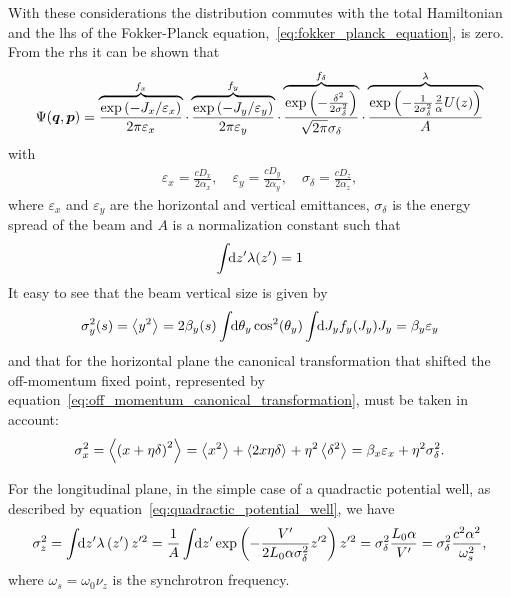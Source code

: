     With these considerations the distribution commutes with the total Hamiltonian and the \gls{lhs} of the Fokker-Planck equation,~\eqref{eq:fokker_planck_equation}, is zero. From the \gls{rhs} it can be shown that
    \begin{align}\label{eq:equilibrium_distribution}
        \Psi(\boldsymbol{q},\boldsymbol{p}) =
        \overbrace{
        \frac{\exp\left(-J_x/\varepsilon_x\right)}{2\pi\varepsilon_x}}^{f_x}\cdot
        \overbrace{
        \frac{\exp\left(-J_y/\varepsilon_y\right)}{2\pi\varepsilon_y}}^{f_y}\cdot
        \overbrace{
        \frac{\exp\left(-\frac{\delta^2}{2\sigma_\delta^2}\right)}{\sqrt{2\pi}\sigma_\delta}}^{f_\delta}\cdot
        \overbrace{
        \frac{\exp\left(-\frac{1}{2\sigma_\delta^2}\frac2\alpha U(z)\right)}{A}}^{\lambda}
    \end{align}
    with
    \begin{align}
        \varepsilon_x = \frac{cD_x}{2\alpha_x}, \quad
        \varepsilon_y = \frac{cD_y}{2\alpha_y}, \quad
        \sigma_\delta = \frac{cD_z}{2\alpha_z},
    \end{align}
    where $\varepsilon_x$ and $\varepsilon_y$ are the horizontal and vertical emittances, $\sigma_\delta$ is the energy spread of the beam and $A$ is a normalization constant such that
    \begin{align}
        \int\!\!\text{d}z' \lambda(z')=1
    \end{align}
    It easy to see that the beam vertical size is given by
    \begin{align}
        \sigma_y^2(s) = \left\langle y^2 \right\rangle_{{}} = 2\beta_y(s)\int\!\!\text{d}\theta_y \cos^2(\theta_y)\int\!\!\text{d}J_y f_y(J_y)J_y = \beta_y\varepsilon_y
    \end{align}
    and that for the horizontal plane the canonical transformation that shifted the off-momentum fixed point, represented by equation~\eqref{eq:off_momentum_canonical_transformation}, must be taken in account:
    \begin{align}
        \sigma_x^2 = \left\langle \left(x+\eta\delta\right)^2 \right\rangle_{{}} = \left\langle x^2 \right\rangle_{{}} + \left\langle 2x\eta\delta \right\rangle_{{}} + \eta^2\left\langle \delta^2 \right\rangle_{{}} = \beta_x\varepsilon_x + \eta^2\sigma_\delta^2.
    \end{align}

    For the longitudinal plane, in the simple case of a quadractic potential well, as described by equation~\eqref{eq:quadractic_potential_well}, we have
    \begin{align}
        \sigma_z^2 = \int\!\!\text{d}z' \lambda\left(z'\right)z'^2 =
        \frac1A\int\!\!\text{d}z' 
            \exp\left(-\frac{V'}{2L_0\alpha\sigma_\delta^2} z'^2\right)z'^2
        = \sigma_\delta^2\frac{L_0\alpha}{V'} = \sigma_\delta^2 \frac{c^2\alpha^2}{\omega_s^2},
    \end{align}
    where $\omega_s = \omega_0\nu_z$ is the synchrotron frequency.


